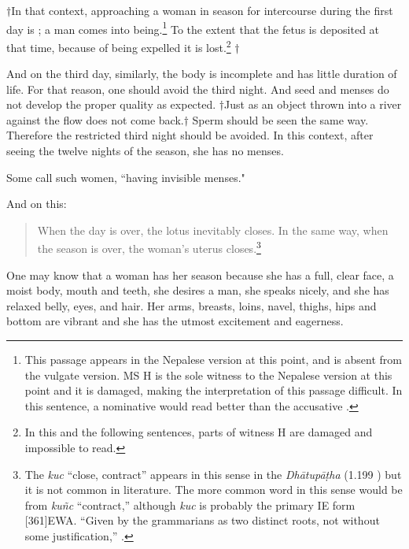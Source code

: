 \begin{translation}
\item[3.3.6.1]

$\dag$In that context, approaching a woman in season for intercourse
during the first day is ; a
man comes into being.\footnote{This passage appears in the Nepalese
    version at this point, and is absent from the vulgate version.  MS H
    is the sole witness to the Nepalese version at this point and it is
    damaged, making the interpretation of this passage difficult.  In this
    sentence, a nominative would read better than the accusative
    .} %
    To the extent that the fetus is deposited at that time, because of
    being expelled it is lost.\footnote{In this and the following
        sentences, parts of witness H are damaged and impossible to read.}
        $\dag$
    
    And on the third day, similarly, the body is incomplete and has little duration of 
    life.  For that reason, one should avoid the third night. 
    And seed and menses do not develop the proper quality as expected.     
   $\dag$Just as an object thrown into a river against the flow does not come 
   back.$\dag$  Sperm should be seen the same way.  Therefore the restricted third 
   night should be avoided.  In this context, after seeing the twelve nights of the 
   season, she has no menses. 

\item [6cd]

Some call such women, “having invisible menses."

\item [3.3.9]

And on this:
\begin{quote}
    When the day is over, the lotus inevitably closes.  In the same
way, when the season is over, the woman's uterus
closes.\footnote{The \root \emph{kuc} “close, contract” appears in
    this sense in the \emph{Dhātupāṭha} (1.199 ) but it
    is not common in literature.  The more common word in this sense
    would be from \root \emph{kuñc} “contract,” although \emph{kuc} is
    probably the primary IE form [361]{EWA}. “Given by the 
    grammarians as two distinct roots, not without some justification,” 
    \cite[19]{whit-root}.}
\end{quote}

\item[3.3.7--8]

One may know that a woman has her season because she has a full, clear
face, a moist body, mouth and teeth, she desires a man, she speaks
nicely, and she has relaxed belly, eyes, and hair.  Her arms, breasts,
loins, navel, thighs, hips and bottom are vibrant and she
has the utmost excitement and eagerness.



\end{translation}

